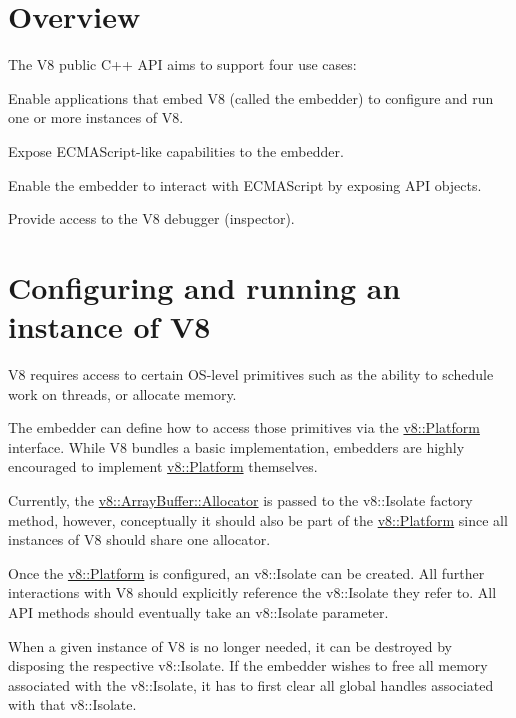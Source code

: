 \section*{Overview}

The V8 public C++ A\+PI aims to support four use cases\+:


\begin{DoxyEnumerate}
\item Enable applications that embed V8 (called the embedder) to configure and run one or more instances of V8.
\item Expose E\+C\+M\+A\+Script-\/like capabilities to the embedder.
\item Enable the embedder to interact with E\+C\+M\+A\+Script by exposing A\+PI objects.
\item Provide access to the V8 debugger (inspector).
\end{DoxyEnumerate}

\section*{Configuring and running an instance of V8}

V8 requires access to certain O\+S-\/level primitives such as the ability to schedule work on threads, or allocate memory.

The embedder can define how to access those primitives via the \mbox{\hyperlink{classv8_1_1Platform}{v8\+::\+Platform}} interface. While V8 bundles a basic implementation, embedders are highly encouraged to implement \mbox{\hyperlink{classv8_1_1Platform}{v8\+::\+Platform}} themselves.

Currently, the \mbox{\hyperlink{classv8_1_1ArrayBuffer_1_1Allocator}{v8\+::\+Array\+Buffer\+::\+Allocator}} is passed to the v8\+::\+Isolate factory method, however, conceptually it should also be part of the \mbox{\hyperlink{classv8_1_1Platform}{v8\+::\+Platform}} since all instances of V8 should share one allocator.

Once the \mbox{\hyperlink{classv8_1_1Platform}{v8\+::\+Platform}} is configured, an v8\+::\+Isolate can be created. All further interactions with V8 should explicitly reference the v8\+::\+Isolate they refer to. All A\+PI methods should eventually take an v8\+::\+Isolate parameter.

When a given instance of V8 is no longer needed, it can be destroyed by disposing the respective v8\+::\+Isolate. If the embedder wishes to free all memory associated with the v8\+::\+Isolate, it has to first clear all global handles associated with that v8\+::\+Isolate.

